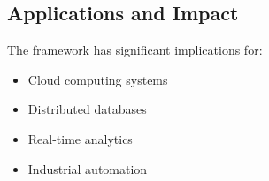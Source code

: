 \subsection{Applications and Impact}
The framework has significant implications for:
\begin{itemize}
    \item Cloud computing systems
    \item Distributed databases
    \item Real-time analytics
    \item Industrial automation
\end{itemize} 